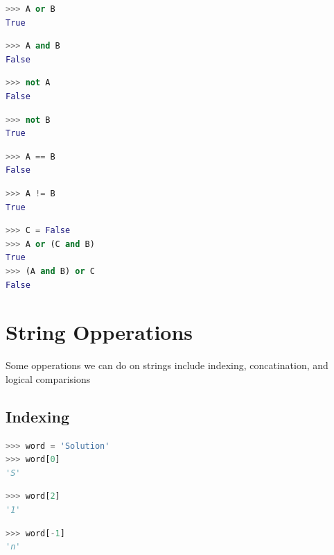 \documentclass{book}
\begin{document}
\begin{lstlisting}[language=Python]
>>> A or B
True
\end{lstlisting}

\begin{lstlisting}[language=Python]
>>> A and B
False
\end{lstlisting}

\begin{lstlisting}[language=Python]
>>> not A
False
\end{lstlisting}

\begin{lstlisting}[language=Python]
>>> not B
True
\end{lstlisting}

\begin{lstlisting}[language=Python]
>>> A == B
False
\end{lstlisting}

\begin{lstlisting}[language=Python]
>>> A != B
True
\end{lstlisting}

\begin{lstlisting}[language=Python]
>>> C = False
>>> A or (C and B)
True
>>> (A and B) or C
False
\end{lstlisting}

    \section{String Opperations}\label{string-opperations}

    Some opperations we can do on strings include indexing, concatination,
and logical comparisions

    \subsection{Indexing}\label{indexing}

    \begin{lstlisting}[language=Python]
>>> word = 'Solution'
>>> word[0]
'S'
\end{lstlisting}

    \begin{lstlisting}[language=Python]
>>> word[2]
'1'
\end{lstlisting}

    \begin{lstlisting}[language=Python]
>>> word[-1]
'n'
\end{lstlisting}
\end{document}

